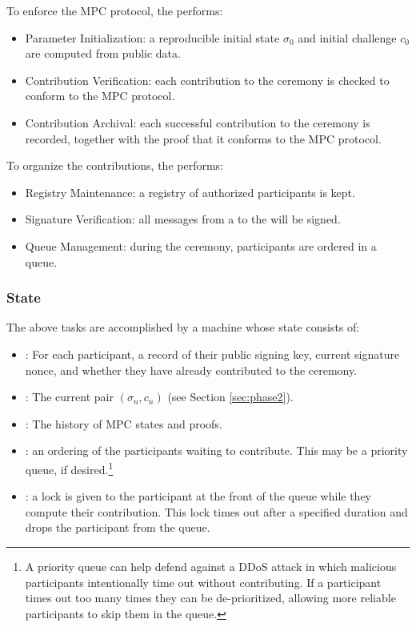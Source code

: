 To enforce the MPC protocol, the \Coordinator{} performs:
\begin{itemize}
    \item Parameter Initialization: a reproducible initial state $\sigma_0$ and initial challenge $c_0$ are computed from public data.
    \item Contribution Verification: each contribution to the ceremony is checked to conform to the MPC protocol.
    \item Contribution Archival: each successful contribution to the ceremony is recorded, together with the proof that it conforms to the MPC protocol.
\end{itemize}
To organize the contributions, the \Coordinator{} performs:
\begin{itemize}
    \item Registry Maintenance: a registry of authorized participants is kept.
    \item Signature Verification: all messages from a \Contributor{} to the \Coordinator{} will be signed.
    \item Queue Management: during the ceremony, participants are ordered in a queue.
\end{itemize}

\subsubsection*{State}
The above \Coordinator{} tasks are accomplished by a machine whose state consists of:
\begin{itemize}
    \item \Registry{}: For each participant, a record of their public signing key, current signature nonce, and whether they have already contributed to the ceremony.
    \item \MpcState{}: The current pair $(\sigma_n, c_n)$ (see Section \ref{sec:phase2}). 
    \item \Transcript{}: The history of MPC states and proofs.
    \item \Queue{}: an ordering of the participants waiting to contribute. This may be a priority queue, if desired.\footnote{A priority queue can help defend against a DDoS attack in which malicious participants intentionally time out without contributing. If a participant times out too many times they can be de-prioritized, allowing more reliable participants to skip them in the queue.}
    \item \TimedLock{}: a lock is given to the participant at the front of the queue while they compute their contribution. This lock times out after a specified duration and drops the participant from the queue.
\end{itemize}

